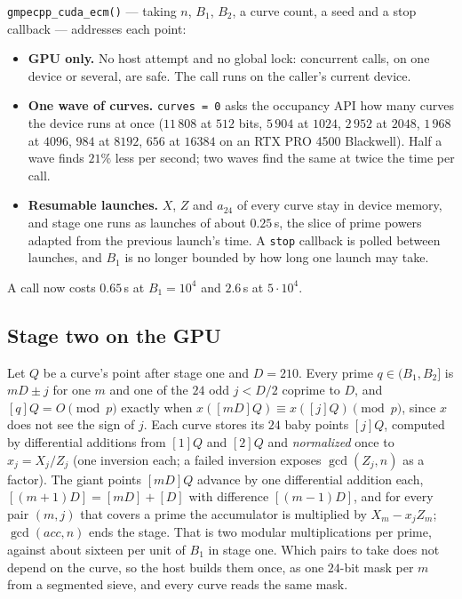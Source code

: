 \documentclass[11pt,a4paper]{article}
\newcommand{\code}[1]{\texttt{#1}}
\begin{document}
\code{gmpecpp\_cuda\_ecm()} --- taking $n$, $B_1$, $B_2$, a curve count, a seed and a stop
callback --- addresses each point:
\begin{itemize}
  \item \textbf{GPU only.} No host attempt and no global lock: concurrent calls, on one device or
    several, are safe. The call runs on the caller's current device.
  \item \textbf{One wave of curves.} \code{curves = 0} asks the occupancy API how many curves the
    device runs at once ($11\,808$ at $512$ bits, $5\,904$ at $1024$, $2\,952$ at $2048$, $1\,968$ at $4096$, $984$ at $8192$, $656$ at $16384$ on an
    RTX PRO 4500 Blackwell). Half a wave finds $21\%$ less per second; two waves find the same at
    twice the time per call.
  \item \textbf{Resumable launches.} $X$, $Z$ and $a_{24}$ of every curve stay in device memory,
    and stage one runs as launches of about $0.25$\,s, the slice of prime powers adapted from the
    previous launch's time. A \code{stop} callback is polled between launches, and $B_1$ is no
    longer bounded by how long one launch may take.
\end{itemize}
A call now costs $0.65$\,s at $B_1 = 10^4$ and $2.6$\,s at $5\cdot10^4$.

\subsection{Stage two on the GPU}

Let $Q$ be a curve's point after stage one and $D = 210$. Every prime $q \in (B_1, B_2]$ is
$mD \pm j$ for one $m$ and one of the $24$ odd $j < D/2$ coprime to $D$, and $[q]Q = O \pmod p$
exactly when $x([mD]Q) \equiv x([j]Q) \pmod p$, since $x$ does not see the sign of $j$. Each
curve stores its $24$ baby points $[j]Q$, computed by differential additions from $[1]Q$ and
$[2]Q$ and \emph{normalized} once to $x_j = X_j/Z_j$ (one inversion each; a failed inversion
exposes $\gcd(Z_j, n)$ as a factor). The giant points $[mD]Q$ advance by one differential
addition each, $[(m+1)D] = [mD] + [D]$ with difference $[(m-1)D]$, and for every pair $(m, j)$
that covers a prime the accumulator is multiplied by $X_m - x_j Z_m$; $\gcd(\mathit{acc}, n)$
ends the stage. That is two modular multiplications per prime, against about sixteen per unit
of $B_1$ in stage one. Which pairs to take does not depend on the curve, so the host builds them
once, as one $24$-bit mask per $m$ from a segmented sieve, and every curve reads the same mask.
\end{document}
